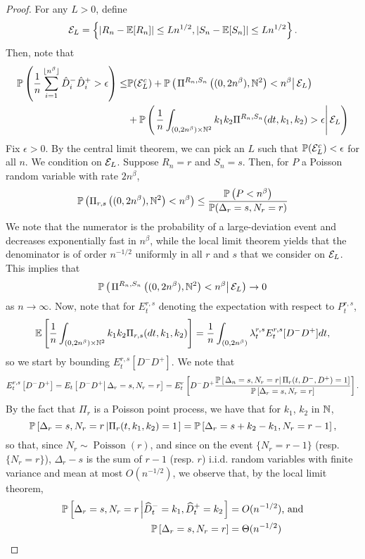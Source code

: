 \begin{proof}
For any $L>0$, define
$$\cE_L=\left\{|R_n-\E[R_n]|\leq Ln^{1/2},  |S_n-\E[S_n]|\leq Ln^{1/2}\right\}.$$
Then, note that 
\begin{align*}\P\left(\frac{1}{n}\sum_{i=1}^{\lfloor n^\beta\rfloor} \hat{D}_i^-\hat{D}_i^+>\epsilon \right)\leq & \P(\cE_L^c) + \P\left(\left.\Pi^{R_n,S_n}\left((0,2n^\beta),\N^2\right)<n^\beta\right|\cE_L \right)\\
&+\P\left(\left.\frac{1}{n}\int_{(0,2n^\beta)\times \N^2}k_1k_2 \Pi^{R_n,S_n}(dt,k_1,k_2)>\epsilon  \right|\cE_L \right)\end{align*}
Fix $\epsilon>0$. By the central limit theorem, we can pick an $L$ such that $\P(\cE_L^c)<\epsilon$ for all $n$. We condition on $\cE_L$. Suppose $R_n=r$ and $S_n=s$. Then, for $P$ a Poisson random variable with rate $2n^\beta$,
 $$\P\left(\Pi_{r,s}\left((0,2n^\beta),\N^2\right)<n^\beta\right)\leq \frac{\P\left(P<n^\beta\right)}{\P(\Delta_r=s, N_r=r)}$$
 We note that the numerator is the probability of a large-deviation event and decreases exponentially fast in $n^\beta$, while the local limit theorem yields that the denominator is of order $n^{-1/2}$ uniformly in all $r$ and $s$ that we consider on $\cE_L$. This implies that $$\P\left(\left.\Pi^{R_n,S_n}\left((0,2n^\beta),\N^2\right)<n^\beta\right|\cE_L\right)\to 0$$
as $n\to \infty$.  
Now, note that for $E^{r,s}_t$ denoting the expectation with respect to $P_t^{r,s}$,
$$\E\left[\frac{1}{n}\int_{(0,2n^\beta)\times \N^2}k_1k_2 \Pi_{r,s}(dt,k_1,k_2) \right]=\frac{1}{n}\int_{(0,2n^\beta)}\lambda^{r,s}_t E^{r,s}_t[D^- D^+]dt,$$
so we start by bounding $E^{r,s}_t[D^- D^+]$. 
We note that
$$E^{r,s}_t\left[{D}^-{D}^+\right]={E}_t\left[\left.{D}^-{D}^+\right| \Delta_r=s, N_r=r\right]={E}^r_t\left[{D}^-{D}^+\frac{\P\left[\left. \Delta_n=s, N_r=r \right|\Pi_r(t,D^-,D^+)=1\right]}{\P\left[ \Delta_r=s, N_r=r\right]}\right].$$
By the fact that $\Pi_r$ is a Poisson point process, we have that for $k_1$, $k_2$ in $\N$, 
$$\P\left[ \Delta_r=s, N_r=r \left| \Pi_r(t,k_1,k_2)=1\right.\right]=\P\left[ \Delta_r=s+k_2-k_1, N_r=r-1 \right],$$
so that, since $N_r\sim \operatorname{Poisson}(r)$, and since on the event $\{N_r=r-1\}$ (resp. $\{N_r=r\}$),  $\Delta_r-s$ is the sum of $r-1$ (resp. $r$) i.i.d. random variables with finite variance and mean at most $O(n^{-1/2})$, we observe that, by the local limit theorem,
\begin{align*}
    \P\left[ \Delta_r=s, N_r=r \left| \widehat{D}^-_t=k_1,\widehat{D}^+_t=k_2\right.\right]&=O(n^{-1/2})\text{, and}\\
    \P\left[ \Delta_r=s, N_r=r \right]&=\Theta(n^{-1/2})

\end{align*}
\end{proof}
